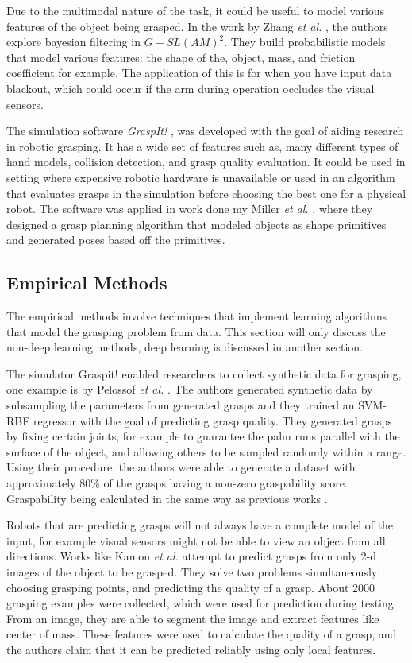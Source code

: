 \documentclass{article}
\begin{document}
Due to the multimodal nature of the task, it could be useful to model various
features of the object being grasped. In the work by Zhang \textit{et al.}
\cite{zhang12}, the authors explore bayesian filtering in $G-SL(AM)^2$. They
build probabilistic models that model various features: the shape of the,
object, mass, and friction coefficient for example. The application of this
is for when you have input data blackout, which could occur if the arm
during operation occludes the visual sensors.

The simulation software \textit{GraspIt!} \cite{miller04}, was developed with
the goal of aiding research in robotic grasping. It has a wide set of features
such as, many different types of hand models, collision detection, and grasp
quality evaluation. It could be used in setting where expensive robotic hardware
is unavailable or used in an algorithm that evaluates grasps in the simulation
before choosing the best one for a physical robot.
The software was applied in work done my Miller
\textit{et al.} \cite{miller03}, where they designed a grasp planning algorithm
that modeled objects as shape primitives and generated poses based off the
primitives.

\subsection{Empirical Methods}
The empirical methods involve techniques that implement learning algorithms that
model the grasping problem from data. This section will only discuss the
non-deep learning methods, deep learning is discussed in another section.

The simulator Graspit! \cite{miller04} enabled researchers to collect synthetic
data for grasping, one example is by Pelossof \textit{et al.} \cite{pelossof04}.
The authors generated synthetic data by subsampling the parameters from
generated grasps and they trained an
SVM-RBF regressor with the goal of predicting grasp quality. They generated
grasps by fixing certain joints, for example to guarantee the palm runs
parallel with the surface of the object, and allowing others to be sampled
randomly within a range. Using their procedure, the authors were able to
generate a dataset with approximately $80\%$ of the grasps having a non-zero
graspability score. Graspability being calculated in the same way as previous
works \cite{ferrari92}.

Robots that are predicting grasps will not always have a complete model of the
input, for example visual sensors might not be able to view an object from all
directions. Works like Kamon \textit{et al.} \cite{kamon96} attempt to predict
grasps from only 2-d images of the object to be grasped. They solve two problems
simultaneously: choosing grasping points, and predicting the quality of a grasp.
About 2000 grasping examples were collected, which were used for prediction during
testing. From an image, they
are able to segment the image and extract features like center of mass. These
features were used to calculate the quality of a grasp, and the authors claim
that it can be predicted reliably using only local features.
\end{document}
